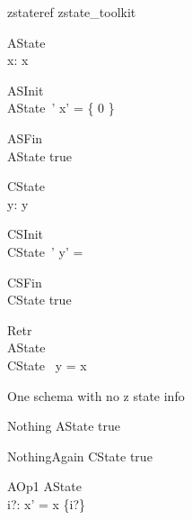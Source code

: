 
\begin{zsection}
   \SECTION zstateref \parents zstate\_toolkit
\end{zsection}

\begin{schema}{AState}
\zastate\\
   x: \power \nat
\where
  x \neq \emptyset
\end{schema}

\begin{schema}{ASInit}
\zastinit\\
   AState~'
\where
   x' = \{ 0 \}
\end{schema}

\begin{schema}{ASFin}
\zastfin\\
   AState
\where
   true
\end{schema}

\begin{schema}{CState}
\zcstate\\
  y: \seq \nat
\where
   y \neq \langle \rangle
\end{schema}

\begin{schema}{CSInit}
\zcstinit\\
   CState~'
\where
  y' =  \rangle
\end{schema}

\begin{schema}{CSFin}
\zcstfin\\
   CState
\where
   true
\end{schema}

\begin{schema}{Retr}
\zretrieve\\
   AState \\
   CState
\where
   \ran~y = x
\end{schema}

One schema with no z state info
\begin{schema}{Nothing}
   \Delta AState
\where
   true
\end{schema}

\begin{schema}{NothingAgain}
   \Delta CState
\where
   true
\end{schema}

\begin{schema}{AOp1}
   \Delta AState \\
   i?: \nat
\where
   x' = x \cup \{i?\}
\end{schema}

